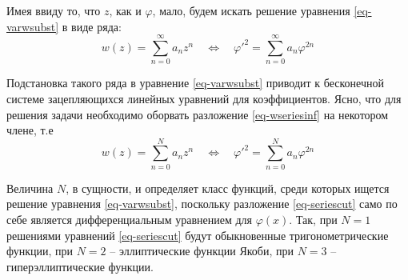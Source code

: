 Имея ввиду то, что $z$, как и $\varphi$, мало, будем искать решение уравнения \ref{eq-varwsubst} в виде ряда:
\begin{equation}
w(z) = \sum_{n=0}^\infty a_n z^n \quad \Leftrightarrow \quad 
\varphi'^2 = \sum_{n=0}^\infty a_n \varphi^{2n}
\label{eq-wseriesinf}
\end{equation}

Подстановка такого ряда в уравнение \ref{eq-varwsubst} приводит к бесконечной системе зацепляющихся линейных уравнений для коэффициентов.
Ясно, что для решения задачи необходимо оборвать разложение \ref{eq-wseriesinf} на некотором члене, т.е 
\begin{equation}
w(z) = \sum_{n=0}^N a_n z^n \quad \Leftrightarrow \quad 
\varphi'^2 = \sum_{n=0}^N a_n \varphi^{2n}
\label{eq-seriescut}
\end{equation}

Величина $N$, в сущности, и определяет класс функций, среди которых ищется решение уравнения \ref{eq-varwsubst}, поскольку разложение \ref{eq-seriescut} само по себе является дифференциальным уравнением для $\varphi(x)$.
Так, при $N=1$ решениями уравнений \ref{eq-seriescut} будут обыкновенные тригонометрические функции, при $N=2$ -- эллиптические функции Якоби, при $N=3$ -- гиперэллиптические функции.
